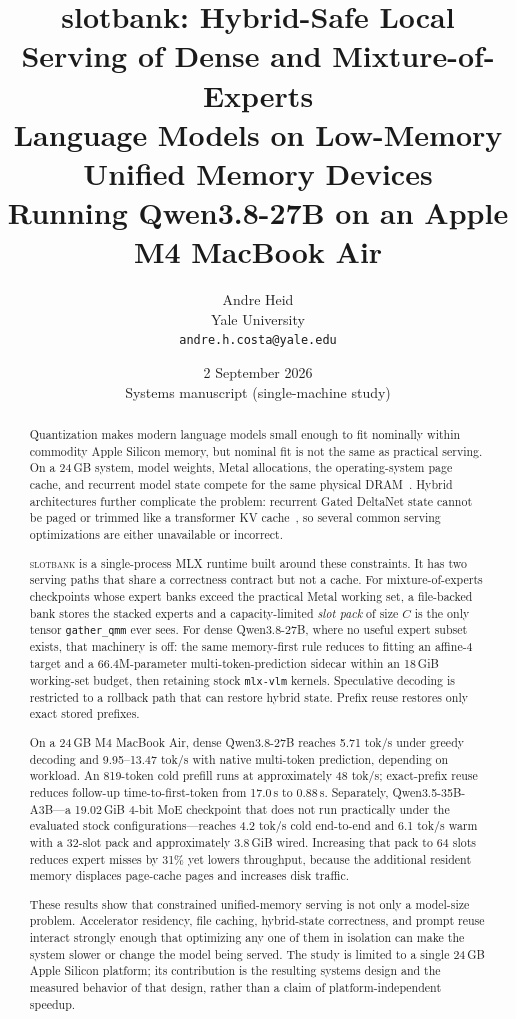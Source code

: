 \documentclass[11pt]{article}
\title{\vspace{-1.2em}
\textbf{slotbank}: Hybrid-Safe Local Serving of Dense and Mixture-of-Experts\\
Language Models on Low-Memory Unified Memory Devices\\[0.4em]
\large Running Qwen3.8-27B on an Apple M4 MacBook Air}
\author{
Andre Heid\\
Yale University\\
\texttt{andre.h.costa@yale.edu}
}
\date{2 September 2026 \\[0.3em] \small Systems manuscript (single-machine study)}
\theoremstyle{definition}
\newcommand{\slotbank}{\textsc{slotbank}}
\newcommand{\gdn}{Gated DeltaNet}
\begin{document}
\maketitle
\thispagestyle{fancy}

\begin{abstract}
Quantization makes modern language models small enough to fit nominally within commodity Apple Silicon memory, but nominal fit is not the same as practical serving. On a 24\,GB system, model weights, Metal allocations, the operating-system page cache, and recurrent model state compete for the same physical DRAM~\citep{appleum}. Hybrid architectures further complicate the problem: recurrent \gdn{} state cannot be paged or trimmed like a transformer KV cache~\citep{yang2024gateddelta,qwen3}, so several common serving optimizations are either unavailable or incorrect.

\slotbank{} is a single-process MLX runtime built around these constraints. It has two serving paths that share a correctness contract but not a cache. For mixture-of-experts checkpoints whose expert banks exceed the practical Metal working set, a file-backed bank stores the stacked experts and a capacity-limited \emph{slot pack} of size $C$ is the only tensor \texttt{gather\_qmm} ever sees. For dense Qwen3.8-27B, where no useful expert subset exists, that machinery is off: the same memory-first rule reduces to fitting an affine-4 target and a 66.4M-parameter multi-token-prediction sidecar within an 18\,GiB working-set budget, then retaining stock \texttt{mlx-vlm} kernels. Speculative decoding is restricted to a rollback path that can restore hybrid state. Prefix reuse restores only exact stored prefixes.

On a 24\,GB M4 MacBook Air, dense Qwen3.8-27B reaches 5.71 tok/s under greedy decoding and 9.95--13.47 tok/s with native multi-token prediction, depending on workload. An 819-token cold prefill runs at approximately 48 tok/s; exact-prefix reuse reduces follow-up time-to-first-token from 17.0\,s to 0.88\,s. Separately, Qwen3.5-35B-A3B---a 19.02\,GiB 4-bit MoE checkpoint that does not run practically under the evaluated stock configurations---reaches 4.2 tok/s cold end-to-end and 6.1 tok/s warm with a 32-slot pack and approximately 3.8\,GiB wired. Increasing that pack to 64 slots reduces expert misses by 31\% yet lowers throughput, because the additional resident memory displaces page-cache pages and increases disk traffic.

These results show that constrained unified-memory serving is not only a model-size problem. Accelerator residency, file caching, hybrid-state correctness, and prompt reuse interact strongly enough that optimizing any one of them in isolation can make the system slower or change the model being served. The study is limited to a single 24\,GB Apple Silicon platform; its contribution is the resulting systems design and the measured behavior of that design, rather than a claim of platform-independent speedup.
\end{abstract}
\end{document}
